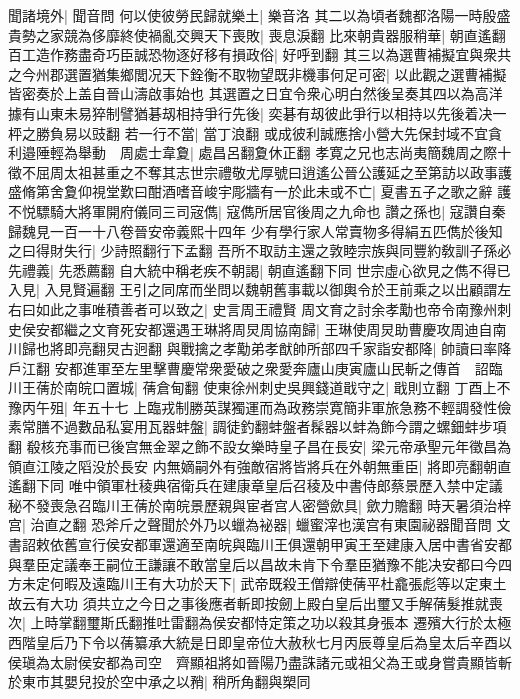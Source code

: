 聞諸境外|{
	聞音問}
何以使彼勞民歸就樂土|{
	樂音洛}
其二以為頃者魏都洛陽一時殷盛貴勢之家競為侈靡終使禍亂交興天下喪敗|{
	喪息淚翻}
比來朝貴器服稍華|{
	朝直遙翻}
百工造作務盡奇巧臣誠恐物逐好移有損政俗|{
	好呼到翻}
其三以為選曹補擬宜與衆共之今州郡選置猶集鄉閭况天下銓衡不取物望既非機事何足可密|{
	以此觀之選曹補擬皆密奏於上盖自晉山濤啟事始也}
其選置之日宜令衆心明白然後呈奏其四以為高洋據有山東未易猝制譬猶碁刼相持爭行先後|{
	奕碁有刼彼此爭行以相持以先後着决一枰之勝負易以豉翻}
若一行不當|{
	當丁浪翻}
或成彼利誠應捨小營大先保封域不宜貪利邉陲輕為舉動　周處士韋夐|{
	處昌呂翻夐休正翻}
孝寛之兄也志尚夷簡魏周之際十徵不屈周太祖甚重之不奪其志世宗禮敬尤厚號曰逍遙公晉公護延之至第訪以政事護盛脩第舍夐仰視堂歎曰酣酒嗜音峻宇彫牆有一於此未或不亡|{
	夏書五子之歌之辭}
護不悦驃騎大將軍開府儀同三司宼儁|{
	寇儁所居官後周之九命也}
讚之孫也|{
	寇讚自秦歸魏見一百一十八卷晉安帝義熙十四年}
少有學行家人常賣物多得絹五匹儁於後知之曰得財失行|{
	少詩照翻行下孟翻}
吾所不取訪主還之敦睦宗族與同豐約敎訓子孫必先禮義|{
	先悉薦翻}
自大統中稱老疾不朝謁|{
	朝直遙翻下同}
世宗虛心欲見之儁不得已入見|{
	入見賢遍翻}
王引之同席而坐問以魏朝舊事載以御輿令於王前乘之以出顧謂左右曰如此之事唯積善者可以致之|{
	史言周王禮賢}
周文育之討余孝勱也帝令南豫州刺史侯安都繼之文育死安都還遇王琳將周炅周協南歸|{
	王琳使周炅助曹慶攻周迪自南川歸也將即亮翻炅古迥翻}
與戰擒之孝勱弟孝猷帥所部四千家詣安都降|{
	帥讀曰率降戶江翻}
安都進軍至左里擊曹慶常衆愛破之衆愛奔廬山庚寅廬山民斬之傳首　詔臨川王蒨於南皖口置城|{
	蒨倉甸翻}
使東徐州刺史吳興錢道戢守之|{
	戢則立翻}
丁酉上不豫丙午殂|{
	年五十七}
上臨戎制勝英謀獨運而為政務崇寛簡非軍旅急務不輕調發性儉素常膳不過數品私宴用瓦器蚌盤|{
	調徒釣翻蚌盤者髹器以蚌為飾今謂之螺鈿蚌步項翻}
殽核充事而已後宫無金翠之飾不設女樂時皇子昌在長安|{
	梁元帝承聖元年徵昌為領直江陵之䧟没於長安}
内無嫡嗣外有強敵宿將皆將兵在外朝無重臣|{
	將即亮翻朝直遙翻下同}
唯中領軍杜稜典宿衛兵在建康章皇后召稜及中書侍郎蔡景歷入禁中定議秘不發喪急召臨川王蒨於南皖景歷親與宦者宫人密營歛具|{
	歛力贍翻}
時天暑須治梓宫|{
	治直之翻}
恐斧斤之聲聞於外乃以蠟為袐器|{
	蠟蜜滓也漢宫有東園祕器聞音問}
文書詔敕依舊宣行侯安都軍還適至南皖與臨川王俱還朝甲寅王至建康入居中書省安都與羣臣定議奉王嗣位王謙讓不敢當皇后以昌故未肯下令羣臣猶豫不能决安都曰今四方未定何暇及遠臨川王有大功於天下|{
	武帝既殺王僧辯使蒨平杜龕張彪等以定東土故云有大功}
須共立之今日之事後應者斬即按劒上殿白皇后出璽又手解蒨髮推就喪次|{
	上時掌翻璽斯氏翻推吐雷翻為侯安都恃定策之功以殺其身張本}
遷殯大行於太極西階皇后乃下令以蒨纂承大統是日即皇帝位大赦秋七月丙辰尊皇后為皇太后辛酉以侯瑱為太尉侯安都為司空　齊顯祖將如晉陽乃盡誅諸元或祖父為王或身嘗貴顯皆斬於東市其嬰兒投於空中承之以矟|{
	稍所角翻與槊同}
